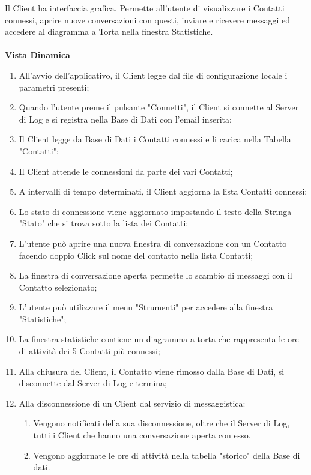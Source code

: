 \documentclass[a4paper, 11pt]{article} %
\begin{document}
Il Client ha interfaccia grafica. Permette all'utente di visualizzare i Contatti connessi, aprire nuove conversazioni con questi, inviare e ricevere messaggi ed accedere al diagramma a Torta nella finestra Statistiche.\\
\\
\textbf{Vista Dinamica}
\begin{enumerate}
\item All'avvio dell'applicativo, il Client legge dal file di configurazione locale i parametri presenti;
\item Quando l'utente preme il pulsante "Connetti", il Client si connette al Server di Log e si registra nella Base di Dati con l'email inserita;
\item Il Client legge da Base di Dati i Contatti connessi e li carica nella Tabella "Contatti";
\item Il Client attende le connessioni da parte dei vari Contatti;
\item A intervalli di tempo determinati, il Client aggiorna la lista Contatti connessi;
\item Lo stato di connessione viene aggiornato impostando il testo della Stringa "Stato" che si trova sotto la lista dei Contatti;
\item L'utente pu\`o aprire una nuova finestra di conversazione con un Contatto facendo doppio Click sul nome del contatto nella lista Contatti;
\item La finestra di conversazione aperta permette lo scambio di messaggi con il Contatto selezionato;
\item L'utente pu\`o utilizzare il menu "Strumenti" per accedere alla finestra "Statistiche";
\item La finestra statistiche contiene un diagramma a torta che rappresenta le ore di attivit\`a dei 5 Contatti pi\`u connessi;
\item Alla chiusura del Client, il Contatto viene rimosso dalla Base di Dati, si disconnette dal Server di Log e termina;
\item Alla disconnessione di un Client dal servizio di messaggistica:
\begin{enumerate}
\item Vengono notificati della sua disconnessione, oltre che il Server di Log, tutti i Client che hanno una conversazione aperta con esso.
\item Vengono aggiornate le ore di attivit\`a nella tabella "storico" della Base di dati.
\end{enumerate}
\end{enumerate}
\end{document}
